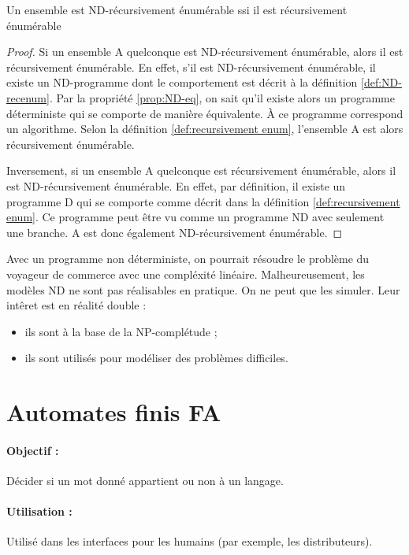 \begin{myprop}
	Un ensemble est ND-récursivement énumérable ssi il est récursivement énumérable
	\begin{proof}
		Si un ensemble A quelconque est ND-récursivement énumérable, alors il est récursivement
		énumérable.
		En effet, s'il est ND-récursivement énumérable, il existe un ND-programme dont le comportement est décrit à la définition \ref{def:ND-recenum}.
		Par la propriété \ref{prop:ND-eq}, on sait qu'il existe alors un programme déterministe qui se comporte de manière équivalente. À ce programme correspond un algorithme.
		Selon la définition \ref{def:recursivement enum}, l'ensemble A est alors récursivement énumérable.

		Inversement, si un ensemble A quelconque est récursivement énumérable, alors il est ND-récursivement énumérable. En effet, par définition, il existe un programme D qui se comporte comme décrit dans la définition \ref{def:recursivement enum}.
		Ce programme peut être vu comme un programme ND avec seulement une branche. A est donc également ND-récursivement énumérable.
	\end{proof}

\end{myprop}

\begin{myrem}
Avec un programme non déterministe, on pourrait résoudre le problème du voyageur de commerce avec une compléxité linéaire. Malheureusement, les modèles ND ne sont pas réalisables en pratique. On ne peut que les simuler. Leur intêret est en réalité double :
\begin{itemize}
 \item ils sont à la base de la NP-complétude ;
\item ils sont utilisés pour modéliser des problèmes difficiles.
\end{itemize}
\end{myrem}
\section{Automates finis FA}
\label{sub:automates_finis}

\paragraph{Objectif :} Décider si un mot donné appartient ou non à un langage.

\paragraph{Utilisation :} Utilisé dans les interfaces pour les humains (par
exemple, les distributeurs).\\

